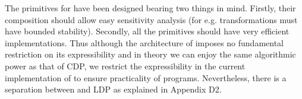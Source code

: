 The primitives for \system have been designed bearing two things in mind. Firstly, their composition should allow easy sensitivity analysis (for e.g. transformations must have bounded stability). Secondly, all the primitives should have very efficient implementations. Thus although the architecture of \system imposes no fundamental restriction on its expressibility and in theory we can enjoy the same algorithmic power as that of \textsf{CDP}, we restrict the expressibility in the current implementation of \system to ensure practicality of \system programs. Nevertheless, there is a separation between \system and \textsf{LDP} as explained in Appendix D2.

